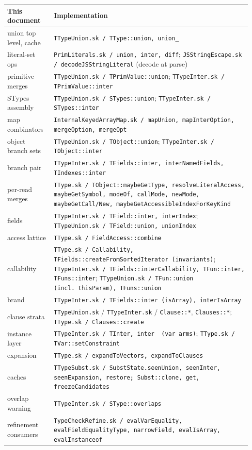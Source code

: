 \documentclass[11pt]{article}
\begin{document}
\begin{center}
\renewcommand{\arraystretch}{1.2}
\small
\begin{tabular}{@{}p{4.1cm}>{\raggedright\arraybackslash}p{10.3cm}@{}}
\toprule
\textbf{This document} & \textbf{Implementation} \\
\midrule
union top level, cache & \texttt{TTypeUnion.sk / TType::union,
  union\_} \\
literal-set ops & \texttt{PrimLiterals.sk / union, inter, diff};
  \texttt{JSStringEscape.sk / decodeJSStringLiteral} (decode at parse) \\
primitive merges & \texttt{TTypeUnion.sk / TPrimValue::union};
  \texttt{TTypeInter.sk / TPrimValue::inter} \\
STypes assembly & \texttt{TTypeUnion.sk / STypes::union};
  \texttt{TTypeInter.sk / STypes::inter} \\
map combinators & \texttt{InternalKeyedArrayMap.sk / mapUnion,
  mapInterOption, mergeOption, mergeOpt} \\
object branch sets & \texttt{TTypeUnion.sk / TObject::union};
  \texttt{TTypeInter.sk / TObject::inter} \\
branch pair & \texttt{TTypeInter.sk / TFields::inter,
  interNamedFields, TIndexes::inter} \\
per-read merges & \texttt{TType.sk / TObject::maybeGetType,
  resolveLiteralAccess, maybeGetSymbol, modeOf, callMode, newMode,
  maybeGetCall/New, maybeGetAccessibleIndexForKeyKind} \\
fields & \texttt{TTypeInter.sk / TField::inter, interIndex};
  \texttt{TTypeUnion.sk / TField::union, unionIndex} \\
access lattice & \texttt{TType.sk / FieldAccess::combine} \\
callability & \texttt{TType.sk / Callability,
  TFields::createFromSortedIterator (invariants)};
  \texttt{TTypeInter.sk / TFields::interCallability, TFun::inter,
  TFuns::inter}; \texttt{TTypeUnion.sk / TFun::union (incl.\
  thisParam), TFuns::union} \\
brand & \texttt{TTypeInter.sk / TFields::inter (isArray),
  interIsArray} \\
clause strata & \texttt{TTypeUnion.sk} / \texttt{TTypeInter.sk} /
  \texttt{Clause::*}, \texttt{Clauses::*}; \texttt{TType.sk /
  Clauses::create} \\
instance layer & \texttt{TTypeInter.sk / TInter, inter\_ (var arms)};
  \texttt{TType.sk / TVar::setConstraint} \\
expansion & \texttt{TType.sk / expandToVectors, expandToClauses} \\
caches & \texttt{TTypeSubst.sk / SubstState.seenUnion, seenInter,
  seenExpansion, restore; Subst::clone, get, freezeCandidates} \\
overlap warning & \texttt{TTypeInter.sk / SType::overlaps} \\
refinement consumers & \texttt{TypeCheckRefine.sk / evalVarEquality,
  evalFieldEqualityType, narrowField, evalIsArray, evalInstanceof} \\
\bottomrule
\end{tabular}
\end{center}
\end{document}
